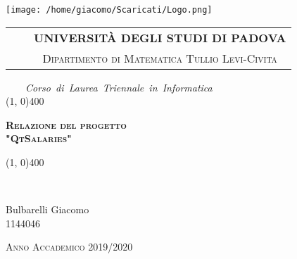 \documentclass[a4paper,10pt]{article}
\begin{document}
\begin{titlepage}
\begin{center}
\begin{minipage}{.20\textwidth}
\texttt{[image: /home/giacomo/Scaricati/Logo.png]}
\end{minipage}
\vfill
\begin{tabular}{c}
 \vspace{1cm}
  \scshape{\Large{\bfseries{$\qquad$UNIVERSIT\`{A} DEGLI STUDI DI PADOVA}}} \\
  \scshape{\Large{$\qquad$Dipartimento di Matematica Tullio Levi-Civita}} \\
\end{tabular}
\vspace{1cm}
\emph{\Large{$\qquad$Corso~di~Laurea~Triennale~in~Informatica}} \\
\vspace{1cm}
\line(1, 0){400} \\
\begin{center}
\scshape{\Large{\bfseries{Relazione del progetto \\ "QtSalaries" }}}
\end{center}

\line(1, 0){400} 
\end{center}
\vfill ~
\vfill
\begin{normalsize}
 \begin{flushleft}
   \hspace{45pt} {Bulbarelli Giacomo} \\
   \vspace{1pt}
   \hspace{45pt} 1144046
 \end{flushleft}
\end{normalsize}
\vfill
\begin{center}
\textsc{Anno Accademico 2019/2020}\\
\end{center}
\end{titlepage}

\newpage

\newpage
\end{document}
